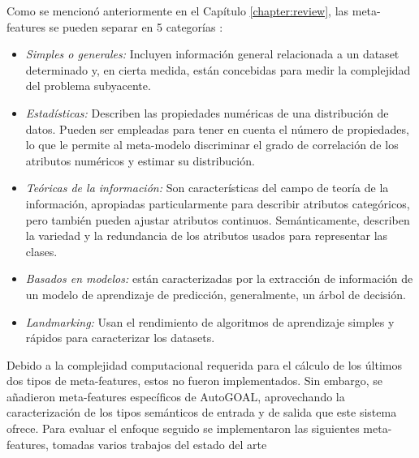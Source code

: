 
Como se mencionó anteriormente en el Capítulo \ref{chapter:review}, las meta-features se pueden separar en 5 categorías \cite{bradzil2009metalearning}:

\begin{itemize}
	\item \textit{Simples o generales:} Incluyen información general relacionada a un dataset determinado y, en cierta medida, están concebidas para medir la complejidad del problema subyacente.
	\item \textit{Estadísticas:} Describen las propiedades numéricas de una distribución de datos. Pueden ser empleadas para tener en cuenta el número de propiedades, lo que le permite al meta-modelo discriminar el grado de correlación de los atributos numéricos y estimar su distribución.
	\item \textit{Teóricas de la información:} Son características del campo de teoría de la información, apropiadas particularmente para describir atributos categóricos, pero también pueden ajustar atributos continuos. Semánticamente, describen la variedad y la redundancia de los atributos usados para representar las clases.
	\item \textit{Basados en modelos:} están caracterizadas por la extracción de información de un modelo de aprendizaje de predicción, generalmente, un árbol de decisión.
	\item \textit{Landmarking:} Usan el rendimiento de algoritmos de aprendizaje simples y rápidos para caracterizar los datasets.
\end{itemize}

Debido a la complejidad computacional requerida para el cálculo de los últimos dos tipos de meta-features, estos no fueron implementados. Sin embargo, se añadieron meta-features específicos de AutoGOAL, aprovechando la caracterización de los tipos semánticos de entrada y de salida que este sistema ofrece. Para evaluar el enfoque seguido se implementaron las siguientes meta-features, tomadas varios trabajos del estado del arte \cite{castiello2005metadata, fuerer2015efficient}


